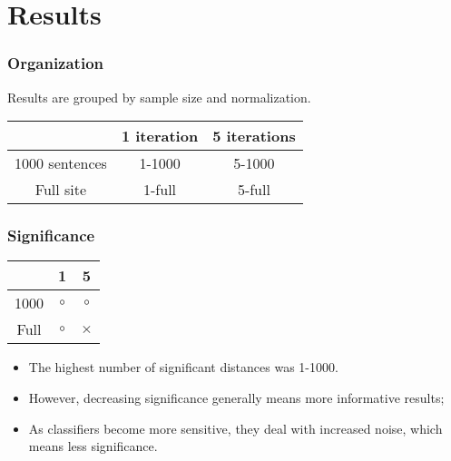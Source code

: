 \documentclass{beamer}
\begin{document}
\section{Results}
\begin{frame}
  \frametitle{Organization}
  Results are grouped by sample size and normalization.
  \begin{tabular}{c|c|c|}
  &  1 iteration & 5 iterations \\ \hline
  1000 sentences & 1-1000 & 5-1000 \\ \hline
Full site &    1-full & 5-full \\ \hline
  \end{tabular}
\end{frame}
\begin{frame}
  \frametitle{Significance}
\begin{center}
  \begin{tabular}{c|c|c|}
  &  1 & 5 \\ \hline
  1000 & $\circ$ &  $\circ$\\ \hline
Full & $\circ$ & $\times$\\ \hline
\end{tabular}
\end{center}
  \begin{itemize}
  \item The highest number of significant distances was 1-1000.
  \item However, decreasing significance generally means more informative
    results;
  \item As classifiers become more sensitive, they deal with increased
    noise, which means less significance.
  \end{itemize}
\end{frame}
\end{document}
